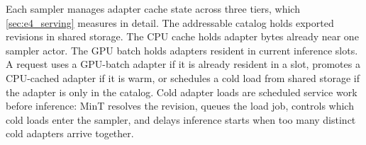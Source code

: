 Each sampler manages adapter cache state across three tiers, which \cref{sec:e4_serving} measures in detail. The addressable catalog holds exported revisions in shared storage. The CPU cache holds adapter bytes already near one sampler actor. The GPU batch holds adapters resident in current inference slots. A request uses a GPU-batch adapter if it is already resident in a slot, promotes a CPU-cached adapter if it is warm, or schedules a cold load from shared storage if the adapter is only in the catalog. Cold adapter loads are scheduled service work before inference: MinT resolves the revision, queues the load job, controls which cold loads enter the sampler, and delays inference starts when too many distinct cold adapters arrive together.
